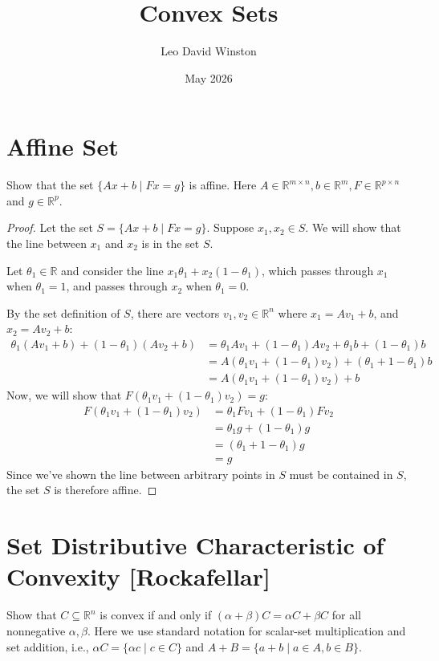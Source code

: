 \documentclass{article}
\title{Convex Sets}
\author{Leo David Winston}
\date{May 2026}
\begin{document}
\maketitle

\section{Affine Set}
Show that the set $\{Ax + b \mid  F x = g\}$ is affine. Here $A \in \mathbb{R}^{m \times n}, b \in \mathbb{R}^m, F \in \mathbb{R}^{p \times n}$ and $g \in \mathbb{R}^p$.

\begin{proof}
Let the set $S = \{Ax + b \mid  F x = g\}$. Suppose $x_1,x_2 \in S$. We will show that the line between $x_1$ and $x_2$ is in the set $S$.

Let $\theta_1 \in \mathbb{R}$ and consider the line $x_1\theta_1 + x_2(1-\theta_1)$, which passes through $x_1$ when $\theta_1 = 1$, and passes through $x_2$ when $\theta_1 = 0$.

By the set definition of $S$, there are vectors $v_1,v_2 \in \mathbb{R}^n$ where $x_1=Av_1+b$, and $x_2 = Av_2+b$:
\begin{align*}
\theta_1(Av_1+b) + (1-\theta_1)(Av_2+b) &= \theta_1 Av_1 + (1-\theta_1)Av_2 + \theta_1 b + (1-\theta_1)b \\
&= A(\theta_1 v_1 + (1-\theta_1)v_2) + (\theta_1 + 1 - \theta_1)b \\
&= A(\theta_1 v_1 + (1-\theta_1)v_2) + b
\end{align*}
Now, we will show that $F(\theta_1v_1 + (1-\theta_1)v_2)=g$:
\begin{align*}
F(\theta_1 v_1 + (1-\theta_1)v_2) &= \theta_1 Fv_1 + (1-\theta_1)Fv_2 \\
&= \theta_1 g + (1-\theta_1)g \\
&= (\theta_1 + 1 - \theta_1)g \\
&= g
\end{align*}
Since we've shown the line between arbitrary points in $S$ must be contained in $S$, the set $S$ is therefore affine.
\end{proof}
\newpage
\section{Set Distributive Characteristic of Convexity [Rockafellar]}
Show that $C \subseteq \mathbb{R}^n$ is convex if and
only if $(\alpha + \beta)C = \alpha C + \beta C$ for all nonnegative $\alpha, \beta$. Here we use standard notation for scalar-set
multiplication and set addition, i.e., $\alpha C = \{\alpha c \mid c \in C\}$ and $A + B = \{a + b \mid a \in A, b \in B\}$.
\end{document}
